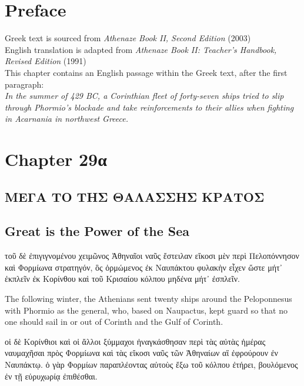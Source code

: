 \documentclass{article}
\begin{document}
\section{Preface}

Greek text is sourced from \emph{Athenaze Book II, Second Edition} (2003) \\
English translation is adapted from \emph{Athenaze Book II: Teacher's Handbook, Revised Edition} (1991) \\

This chapter contains an English passage within the Greek text, after the first paragraph:\\
\em In the summer of 429 BC, 
a Corinthian fleet of forty-seven ships tried to slip through Phormio's blockade
and take reinforcements to their allies when fighting in Acarnania in northwest Greece.
\em

\section{Chapter 29\textgreek{α}}

\subsection*{\textgreek{ΜΕΓΑ ΤΟ ΤΗΣ ΘΑΛΑΣΣΗΣ ΚΡΑΤΟΣ}}
\subsection*{Great is the Power of the Sea}

\begin{greek}
τοῦ δὲ ἐπιγιγνομένου χειμῶνος Ἀθηναῖοι ναῦς ἔστειλαν εἴκοσι μὲν περὶ Πελοπόννησον
καὶ Φορμίωνα στρατηγόν, ὃς ὁρμώμενος ἐκ Ναυπάκτου φυλακὴν εἶχεν ὥστε μήτ᾿ ἐκπλεῖν ἐκ Κορίνθου
καὶ τοῦ Κρισαίου κόλπου μηδένα μήτ᾿ ἐσπλεῖν. \\
\end{greek}


The following winter, the Athenians sent twenty ships around the Peloponnesus
with Phormio as the general, who, based on Naupactus, kept guard
so that no one should sail in or out of Corinth and the Gulf of Corinth. \\ %


\begin{greek}
οἱ δὲ Κορίνθιοι καὶ οἱ ἄλλοι ξύμμαχοι ἠναγκάσθησαν
περὶ τὰς αὐτὰς ἡμέρας ναυμαχῆσαι πρὸς Φορμίωνα
καὶ τὰς εἴκοσι ναῦς τῶν Ἀθηναίων αἳ ἐφρούρουν ἐν Ναυπάκτῳ.
ὁ γὰρ Φορμίων παραπλέοντας αὐτοὺς ἔξω τοῦ κόλπου ἐτήρει,
βουλόμενος ἐν τῇ εὐρυχωρίᾳ ἐπιθέσθαι. \\
\end{greek}
\end{document}

